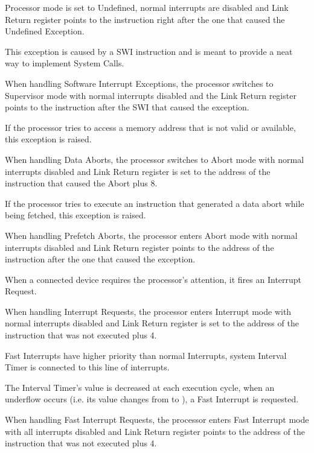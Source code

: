 Processor mode is set to Undefined, normal interrupts are disabled and Link Return register points to the instruction right after the one that caused the Undefined Exception.

This exception is caused by a SWI instruction and is meant to provide a neat way to implement System Calls. 

When handling Software Interrupt Exceptions, the processor switches to Supervisor mode with normal interrupts disabled and the Link Return register points to the instruction after the SWI that caused the exception.

If the processor tries to access a memory address that is not valid or available, this exception is raised.

When handling Data Aborts, the processor switches to Abort mode with normal interrupts disabled and Link Return register is set to the address of the instruction that caused the Abort plus 8.


If the processor tries to execute an instruction that generated a data abort while being fetched, this exception is raised.

When handling Prefetch Aborts, the processor enters Abort mode with normal interrupts disabled and Link Return register points to the address of the instruction after the one that caused the exception.

When a connected device requires the processor's attention, it fires an Interrupt Request.

When handling Interrupt Requests, the processor enters Interrupt mode with normal interrupts disabled and Link Return register is set to the address of the instruction that was not executed plus 4.

Fast Interrupts have higher priority than normal Interrupts, system Interval Timer is connected to this line of interrupts. 

The Interval Timer's value is decreased at each execution cycle, when an underflow occurs (i.e. its value changes from  to ), a Fast Interrupt is requested.

When handling Fast Interrupt Requests, the processor enters Fast Interrupt mode with all interrupts disabled and Link Return register points to the address of the instruction that was not executed plus 4.

